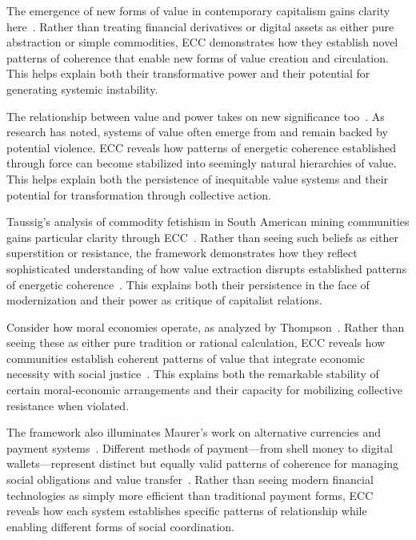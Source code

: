 The emergence of new forms of value in contemporary capitalism gains clarity here~\cite{appadurai1986social,ong2006neoliberalism}. Rather than treating financial derivatives or digital assets as either pure abstraction or simple commodities, ECC demonstrates how they establish novel patterns of coherence that enable new forms of value creation and circulation. This helps explain both their transformative power and their potential for generating systemic instability.

The relationship between value and power takes on new significance too~\cite{graeber2001toward,foucault1980power}. As research has noted, systems of value often emerge from and remain backed by potential violence. ECC reveals how patterns of energetic coherence established through force can become stabilized into seemingly natural hierarchies of value. This helps explain both the persistence of inequitable value systems and their potential for transformation through collective action.

Taussig's analysis of commodity fetishism in South American mining communities gains particular clarity through ECC~\cite{taussig1980devil}. Rather than seeing such beliefs as either superstition or resistance, the framework demonstrates how they reflect sophisticated understanding of how value extraction disrupts established patterns of energetic coherence~\cite{kohn2013how}. This explains both their persistence in the face of modernization and their power as critique of capitalist relations.

Consider how moral economies operate, as analyzed by Thompson~\cite{thompson1971moral}. Rather than seeing these as either pure tradition or rational calculation, ECC reveals how communities establish coherent patterns of value that integrate economic necessity with social justice~\cite{tsing2015mushroom,wolf1999envisioning}. This explains both the remarkable stability of certain moral-economic arrangements and their capacity for mobilizing collective resistance when violated.

The framework also illuminates Maurer's work on alternative currencies and payment systems~\cite{maurer2015how}. Different methods of payment—from shell money to digital wallets—represent distinct but equally valid patterns of coherence for managing social obligations and value transfer~\cite{appadurai1996modernity}. Rather than seeing modern financial technologies as simply more efficient than traditional payment forms, ECC reveals how each system establishes specific patterns of relationship while enabling different forms of social coordination.

